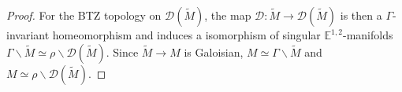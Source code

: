 \documentclass[a4paper,12pt]{article}
\def\D{\mathcal{D}}
\def\D{\mathcal{D}}
\newcommand{\mass}[1]{{\mathbb E}^{1,2}_{#1}}
\def\D{\mathcal{D}}
\begin{document}
\begin{proof}
 For the BTZ topology on $\D(\widetilde M)$, the map $\D : \widetilde M \rightarrow \D(\widetilde M)$ is then a $\Gamma$-invariant homeomorphism and induces a isomorphism of singular $\mass{}$-manifolds $\Gamma\backslash\widetilde M\simeq \rho\backslash\D(\widetilde M) $. Since $\widetilde M \rightarrow M$ is Galoisian, $M\simeq \Gamma\backslash\widetilde M$ and 
$M\simeq\rho\backslash\D(\widetilde M)$.
 
 
\end{proof}

%
%
%

%
	
\end{document}
